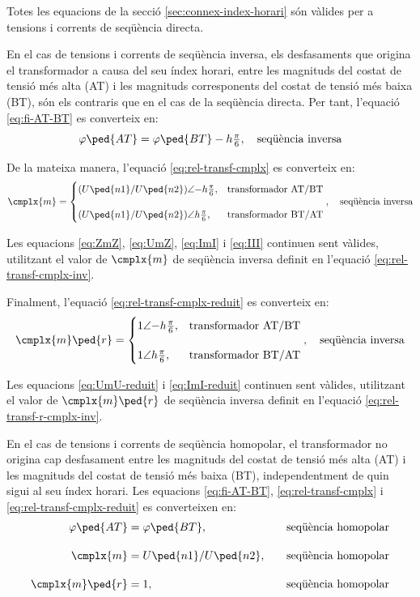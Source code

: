 Totes les equacions de la secció \ref{sec:connex-index-horari} són vàlides per a tensions i corrents de seqüència directa.

En el cas de tensions i corrents de seqüència inversa, els desfasaments que origina el transformador a causa del seu índex horari, entre les magnituds  del costat de tensió més alta (AT) i les magnituds corresponents del costat de tensió més baixa (BT), són els contraris que en el cas de la seqüència directa. Per tant, l'equació  \eqref{eq:fi-AT-BT} es converteix en:
\begin{equation}
    \varphi\ped{AT} = \varphi\ped{BT} - h\tfrac{\pi}{6}, \quad\text{seqüència inversa}
\end{equation}

De la mateixa manera, l'equació \eqref{eq:rel-transf-cmplx} es converteix en:
\begin{equation}\label{eq:rel-transf-cmplx-inv}
\cmplx{m} = \begin{cases}
     (U\ped{n1}/U\ped{n2})\angle{-h} \frac{\pi}{6}, & \text{transformador AT/BT}\\[2.7ex]
     (U\ped{n1}/U\ped{n2})\angle h \frac{\pi}{6}, & \text{transformador BT/AT}
\end{cases},
\quad\text{seqüència inversa}
\end{equation}

Les equacions \eqref{eq:ZmZ}, \eqref{eq:UmZ}, \eqref{eq:ImI} i \eqref{eq:III} continuen sent vàlides, utilitzant el valor de $\cmplx{m}$ de seqüència inversa definit en l'equació \eqref{eq:rel-transf-cmplx-inv}.

Finalment, l'equació \eqref{eq:rel-transf-cmplx-reduit} es converteix en:
\begin{equation}\label{eq:rel-transf-r-cmplx-inv}
\cmplx{m}\ped{r}  = 
\begin{cases}
      1\angle{-h}\frac{\pi}{6}, & \text{transformador AT/BT}\\[2.7ex]
      1\angle h\frac{\pi}{6}, & \text{transformador BT/AT}
\end{cases},
\quad\text{seqüència inversa}
\end{equation}

Les equacions \eqref{eq:UmU-reduit} i \eqref{eq:ImI-reduit} continuen sent vàlides, utilitzant el valor de $\cmplx{m}\ped{r}$ de seqüència inversa definit en l'equació \eqref{eq:rel-transf-r-cmplx-inv}.

En el cas de tensions i corrents de seqüència homopolar, el transformador no  origina cap desfasament entre les magnituds  del costat de tensió més alta (AT) i les magnituds del costat de tensió més baixa (BT), independentment de quin sigui al seu índex horari. Les equacions \eqref{eq:fi-AT-BT}, \eqref{eq:rel-transf-cmplx} i \eqref{eq:rel-transf-cmplx-reduit} es converteixen en:
\begin{alignat}{3}
  \varphi\ped{AT} &= \varphi\ped{BT}, &&\quad\text{seqüència homopolar} \\[1em]
  \cmplx{m} &= U\ped{n1}/U\ped{n2}, &&\quad\text{seqüència homopolar}\label{eq:rel-transf-cmplx-hom} \\[1em]
  \cmplx{m}\ped{r} &= 1, &&\quad\text{seqüència homopolar}
\end{alignat}


